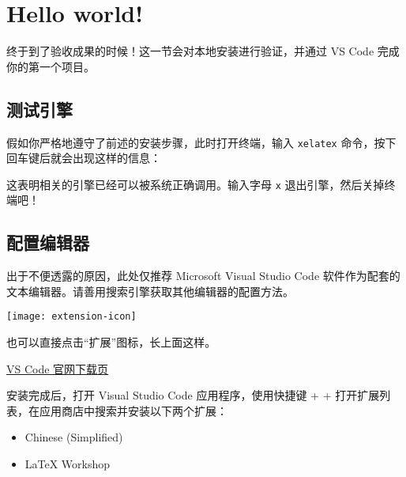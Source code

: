 \section{Hello world!}
\label{sec:hw}

\begin{widepar}
  终于到了验收成果的时候！这一节会对本地安装进行验证，并通过 VS Code 完成你的第一个项目。
\end{widepar}


\subsection{测试引擎}

假如你严格地遵守了前述的安装步骤，此时打开终端，输入 \texttt{xelatex} 命令，按下回车键后就会出现这样的信息：


这表明相关的引擎已经可以被系统正确调用。输入字母 \texttt{x} 退出引擎，然后关掉终端吧！

\subsection{配置编辑器}

出于不便透露的原因，此处仅推荐 Microsoft Visual Studio Code 软件作为配套的文本编辑器。请善用搜索引擎获取其他编辑器的配置方法。

\begin{marginfigure}
\centering
\texttt{[image: extension-icon]}
\caption{也可以直接点击“扩展”图标，长上面这样。}
\end{marginfigure}

\medskip
\href{https://code.visualstudio.com/Download}{\faCloudDownload* VS Code 官网下载页}
\medskip

安装完成后，打开 Visual Studio Code 应用程序，使用快捷键  +  +  打开扩展列表，在应用商店中搜索并安装以下两个扩展：
\begin{itemize}
  \item Chinese (Simplified)
  \item LaTeX Workshop
\end{itemize}

